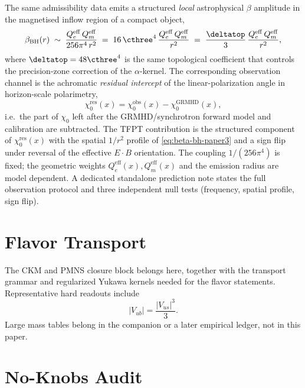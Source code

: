 \begin{remark}
\label{rem:dyonic-intercept-alpha-kernel}
The same admissibility data emits a structured \emph{local} astrophysical $\beta$ amplitude in
the magnetised inflow region of a compact object,
\begin{equation}
\label{eq:beta-bh-paper3}
\beta_{\mathrm{BH}}(r)\;\sim\;\frac{Q_e^{\mathrm{eff}}\,Q_m^{\mathrm{eff}}}{256\pi^4\,r^2}
\;=\;16\,\cthree^4\,\frac{Q_e^{\mathrm{eff}}\,Q_m^{\mathrm{eff}}}{r^2}
\;=\;\frac{\deltatop}{3}\,\frac{Q_e^{\mathrm{eff}}\,Q_m^{\mathrm{eff}}}{r^2},
\end{equation}
where $\deltatop=48\cthree^4$ is the same topological coefficient that controls the precision-zone
correction of the $\alpha$-kernel. The corresponding observation channel is the achromatic
\emph{residual intercept} of the linear-polarization angle in horizon-scale polarimetry,
\[
\chi_0^{\mathrm{res}}(x)
=
\chi_0^{\mathrm{obs}}(x)-\chi_0^{\mathrm{GRMHD}}(x),
\]
i.e.\ the part of $\chi_0$ left after the GRMHD/synchrotron forward model and calibration are
subtracted. The TFPT contribution is the structured component of $\chi_0^{\mathrm{res}}(x)$ with
the spatial $1/r^2$ profile of \eqref{eq:beta-bh-paper3} and a sign flip under reversal of the
effective $E\!\cdot\!B$ orientation. The coupling $1/(256\pi^4)$ is fixed; the geometric weights
$Q_e^{\mathrm{eff}}(x), Q_m^{\mathrm{eff}}(x)$ and the emission radius are model dependent. A
dedicated standalone prediction note states the full observation protocol and three independent
null tests (frequency, spatial profile, sign flip).
\end{remark}

\section{Flavor Transport}

The CKM and PMNS closure block belongs here, together with the transport grammar and regularized
Yukawa kernels needed for the flavor statements. Representative hard readouts include
\[
|V_{ub}|=\frac{|V_{us}|^3}{3}.
\]
Large mass tables belong in the companion or a later empirical ledger, not in this paper.

\section{No-Knobs Audit}

